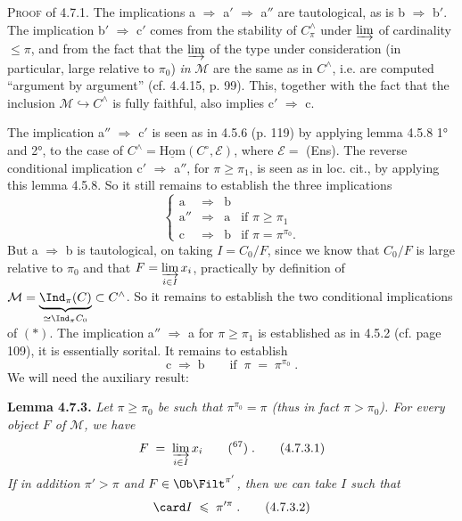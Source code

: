 
\textsc{Proof} of 4.7.1. The implications a $\Longrightarrow$ a$'$ $\Longrightarrow$ a$''$ are tautological, as is b $\Longrightarrow$ b$'$. The implication b$'$ $\Longrightarrow$ c$'$ comes from the stability of $C^{\wedge}_{\pi}$ under $\varinjlim$ of cardinality $\leqslant \pi$, and from the fact that the $\varinjlim$ of the type under consideration (in particular, large relative to $\pi_0$) \textit{in} $\mathcal{M}$ are the same as in $C^{\wedge}$, i.e. are computed ``argument by argument'' (cf. 4.4.15, p. 99). This, together with the fact that the inclusion $\mathcal{M} \hookrightarrow C^{\wedge}$ is fully faithful, also implies c$'$ $\Longrightarrow$ c.

The implication a$''$ $\Longrightarrow$ c$'$ is seen as in 4.5.6 (p. 119) by applying lemma 4.5.8 1° and 2°, to the case of $C^{\wedge} = \underline{\mathrm{Hom}}(C^{\circ}, \mathcal{E})$, where $\mathcal{E} =$ (Ens). The reverse conditional implication c$'$ $\Longrightarrow$ a$''$, for $\pi \geqslant \pi_1$, is seen as in loc. cit., by applying this lemma 4.5.8. So it still remains to establish the three implications
\[
\left\{
\begin{array}{ccll}
\text{a} & \Longrightarrow & \text{b} & \\[4pt]
\text{a}'' & \Longrightarrow & \text{a} & \text{if } \pi \geqslant \pi_1 \\[4pt]
\text{c} & \Longrightarrow & \text{b} & \text{if } \pi = \pi^{\pi_0}.
\end{array}
\right. \tag*{$(*)$}
\]
But a $\Longrightarrow$ b is tautological, on taking $I = C_0/F$, since we know that $C_0/F$ is large relative to $\pi_0$ and that $F = \varinjlim\limits_{i \in I} x_i$, practically by definition of $\mathcal{M} = \underbrace{\Ind_{\pi}(C)}_{\simeq \Ind_{\pi} C_0} \subset C^{\wedge}$. So it remains to establish the two conditional implications of $(*)$. The implication a$''$ $\Longrightarrow$ a for $\pi \geqslant \pi_1$ is established as in 4.5.2 (cf. page 109), it is essentially sorital. It remains to establish
\[
\text{c} \;\Longrightarrow\; \text{b} \qquad \text{if} \;\; \pi \;=\; \pi^{\pi_0} \;. \tag*{$(*)$}
\]
We will need the auxiliary result:

\textbf{Lemma 4.7.3.} \textit{Let $\pi \geqslant \pi_0$ be such that $\pi^{\pi_0} = \pi$ (thus in fact $\pi > \pi_0$). For every object $F$ of $\mathcal{M}$, we have}
\[
F \;=\; \varinjlim_{i \in I} x_i \qquad \text{(\footnotemark[67])}\;. \tag*{(4.7.3.1)}
\]
\textit{If in addition $\pi' > \pi$ and $F \in \Ob \Filt^{\pi'}$, then we can take $I$ such that}
\[
\card I \;\leqslant\; \pi'^{\pi} \;. \tag*{(4.7.3.2)}
\]

